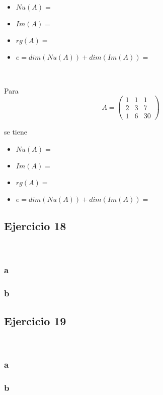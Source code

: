 \documentclass{article}
\begin{document}
\begin{itemize}
    \item $Nu(A) = $ 
    \item $Im(A) = $ 
    \item $rg(A) = $
    \item $e = dim(Nu(A)) + dim(Im(A)) = $  
\end{itemize}

\

\noindent Para \[A = \begin{pmatrix}
    1 & 1 & 1 \\
    2 & 3 & 7 \\
    1 & 6 & 30
\end{pmatrix}\]

\noindent se tiene 

\begin{itemize}
    \item $Nu(A) = $ 
    \item $Im(A) = $ 
    \item $rg(A) = $
    \item $e = dim(Nu(A)) + dim(Im(A)) = $  
\end{itemize}

\subsection*{Ejercicio 18}

\

\subsubsection*{a}

\subsubsection*{b}

\subsection*{Ejercicio 19}

\

\subsubsection*{a}

\subsubsection*{b}
\end{document}
